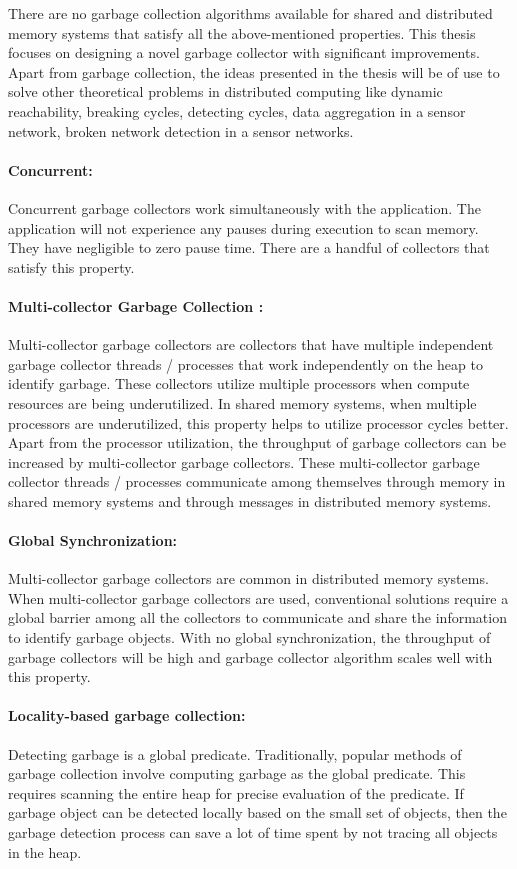 There are no garbage collection algorithms available for shared and distributed memory systems that satisfy all the above-mentioned properties.  This thesis focuses on designing a novel garbage collector with significant improvements. Apart from garbage collection, the ideas presented in the thesis will be of use to solve other theoretical problems in distributed computing like dynamic reachability, breaking cycles, detecting cycles, data aggregation in a sensor network, broken network detection in a sensor networks.


\paragraph{Concurrent:}
Concurrent garbage collectors work simultaneously with the application. The application will not experience any pauses during execution to scan memory. They
have negligible to zero pause time. There are a handful of collectors that satisfy this property. 
\paragraph{Multi-collector Garbage Collection :}
Multi-collector garbage collectors are collectors that have multiple independent garbage collector threads / processes that work independently on the heap to identify garbage. These collectors utilize multiple processors when compute resources are being underutilized. In shared memory systems, when multiple processors are underutilized, this property helps to utilize processor cycles better. Apart from the processor utilization, the throughput of garbage collectors can be increased by multi-collector garbage collectors. These multi-collector garbage collector threads / processes communicate among themselves through memory in shared memory systems and through messages in distributed memory systems.
\paragraph{Global Synchronization:}
Multi-collector garbage collectors are common in distributed memory systems. 
When multi-collector garbage collectors are used, conventional solutions require a global barrier among all the collectors to communicate and share the information to identify garbage objects. With no global synchronization, the throughput of garbage collectors will be high and garbage collector algorithm scales well with this property.
\paragraph{Locality-based garbage collection:}
Detecting garbage is a global predicate. Traditionally, popular methods of garbage collection involve computing garbage as the global predicate. This requires scanning the entire heap for precise evaluation of the predicate. If garbage object can be detected locally based on the small set of objects, then the garbage detection process can save a lot of time spent by not tracing all objects in the heap.
